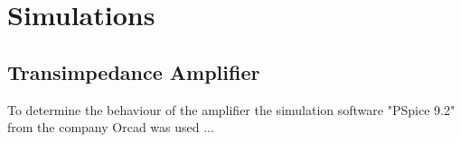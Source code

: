 %
%
%
%
\chapter{Simulations}
\label{Ch:Simulations}
%
\section{Transimpedance Amplifier}
To determine the behaviour of the amplifier the simulation software "PSpice 9.2" from the company Orcad was used ...


